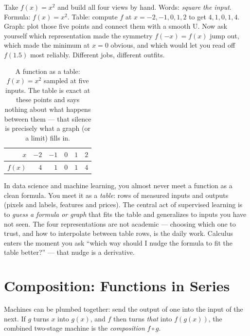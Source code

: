 \begin{labbox}
Take $f(x) = x^2$ and build all four views by hand. Words: \emph{square the
input}. Formula: $f(x)=x^2$. Table: compute $f$ at $x=-2,-1,0,1,2$ to get
$4,1,0,1,4$. Graph: plot those five points and connect them with a smooth U.
Now ask yourself which representation made the symmetry $f(-x)=f(x)$ jump out,
which made the minimum at $x=0$ obvious, and which would let you read off
$f(1.5)$ most reliably. Different jobs, different outfits.
\end{labbox}

\begin{table}[H]
\centering
\caption{A function as a table: $f(x)=x^2$ sampled at five inputs. The table is
exact at these points and says nothing about what happens between them --- that
silence is precisely what a graph (or a limit) fills in.}
\label{ch02:tab-square}
\begin{tabular}{r r r r r r}
\toprule
$x$    & $-2$ & $-1$ & $0$ & $1$ & $2$ \\
\midrule
$f(x)$ & $4$  & $1$  & $0$ & $1$ & $4$ \\
\bottomrule
\end{tabular}
\end{table}

\begin{applicationbox}
In data science and machine learning, you almost never meet a function as a clean
formula. You meet it as a \emph{table}: rows of measured inputs and outputs (pixels
and labels, features and prices). The central act of supervised learning is to
\emph{guess a formula or graph} that fits the table and generalizes to inputs you
have not seen. The four representations are not academic --- choosing which one to
trust, and how to interpolate between table rows, is the daily work. Calculus
enters the moment you ask ``which way should I nudge the formula to fit the table
better?'' --- that nudge is a derivative.
\end{applicationbox}

\section{Composition: Functions in Series}
\label{ch02:composition}

Machines can be plumbed together: send the output of one into the input of the
next. If $g$ turns $x$ into $g(x)$, and $f$ then turns \emph{that} into
$f(g(x))$, the combined two-stage machine is the \emph{composition} $f \circ g$.

